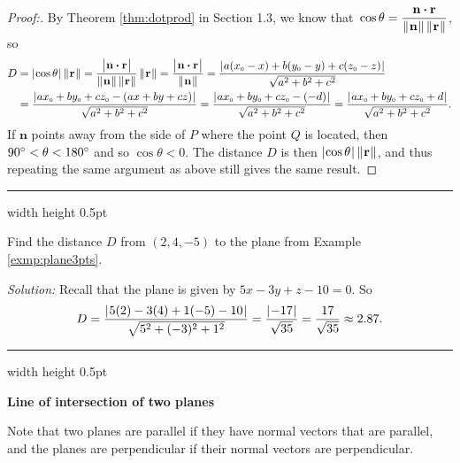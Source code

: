 \begin{proofbar}
\begin{proof}[Proof:]
 By Theorem \ref{thm:dotprod} in Section 1.3, we know that 
 $\,\cos \theta = \dfrac{\textbf{n} \bm{\cdot} \textbf{r}}{\lVert\mspace{1mu}\textbf{n}\mspace{1mu}\rVert\,\lVert\mspace{1mu}\textbf{r}\mspace{1mu}\rVert}$, so
 \begin{align*}
  D &= \lvert\mspace{1mu}\cos \theta\mspace{1mu}\rvert\,\lVert\mspace{1mu}\textbf{r}\mspace{1mu}\rVert
     = \frac{\bigl\lvert\mspace{1mu}\textbf{n} \bm{\cdot} \textbf{r}\mspace{1mu}\bigr\rvert}{\lVert\mspace{1mu}\textbf{n}\mspace{1mu}\rVert \,
     \lVert\mspace{1mu}\textbf{r}\mspace{1mu}\rVert}\,\lVert\mspace{1mu}\textbf{r}\mspace{1mu}\rVert
     = \frac{\bigl\lvert\mspace{1mu}\textbf{n} \bm{\cdot} \textbf{r}\mspace{1mu}\bigr\rvert}{\lVert\mspace{1mu}\textbf{n}\mspace{1mu}\rVert}
     = \frac{\lvert\mspace{1mu}a(x_{\scriptscriptstyle 0} - x) + b(y_{\scriptscriptstyle 0} - y) + c(z_{\scriptscriptstyle 0} - z)\mspace{1mu}\rvert}{\sqrt{a^2 + b^2 + c^2}}\\
    &= \frac{\lvert\mspace{1mu}ax_{\scriptscriptstyle 0} + by_{\scriptscriptstyle 0} + cz_{\scriptscriptstyle 0} - (ax + by + cz)\mspace{1mu}\rvert}{\sqrt{a^2 + b^2 + c^2}}
    = \frac{\lvert\mspace{1mu}ax_{\scriptscriptstyle 0} + by_{\scriptscriptstyle 0} + cz_{\scriptscriptstyle 0} - (-d)\mspace{1mu}\rvert}{\sqrt{a^2 + b^2 + c^2}}
     = \frac{\lvert\mspace{1mu}ax_{\scriptscriptstyle 0} + by_{\scriptscriptstyle 0} + cz_{\scriptscriptstyle 0} + d\mspace{1mu}\rvert}{\sqrt{a^2 + b^2 + c^2}}.
 \end{align*}
 If $\textbf{n}$ points away from the side of $P$ where the point $Q$ is located, then $90^\circ < \theta <
 180^\circ$ and so $\cos \theta < 0$. The distance $D$ is then $\lvert\mspace{1mu}\cos \theta\mspace{1mu}\rvert \, \lVert\mspace{1mu}\textbf{r}\mspace{1mu}\rVert$, and thus
 repeating the same argument as above still gives the same result. \hfill \qedhere
\end{proof}\vspace{-3mm}\end{proofbar}

\hrule width \textwidth height 0.5pt
\begin{exmp}\label{exmp:distptplane}
 Find the distance $D$ from $(2,4,-5)$ to the plane from Example \ref{exmp:plane3pts}.\vspace{1mm}
 \par\noindent\emph{Solution:} Recall that the plane is given by $5x - 3y + z - 10 = 0$. So
 \begin{displaymath}
  D = \frac{\lvert\mspace{1mu}5(2) - 3(4) + 1(-5) - 10\mspace{1mu}\rvert}{\sqrt{5^2 + (-3)^2 + 1^2}} = \frac{\lvert\mspace{1mu}-17\mspace{1mu}\rvert}{\sqrt{35}} =
   \frac{17}{\sqrt{35}} \approx 2.87.
 \end{displaymath}
\end{exmp}
\hrule width \textwidth height 0.5pt
\pagebreak[3]
\par\noindent\textbf{\large{Line of intersection of two planes}}\normalsize\vspace{1.5mm}

\piccaption[]{}
Note that two planes are parallel if they have normal vectors that are parallel, and the planes are perpendicular if
their normal vectors are perpendicular. 

